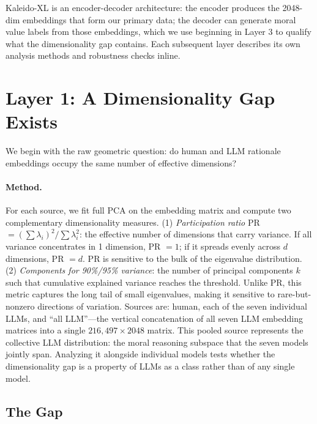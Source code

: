 \documentclass[11pt,a4paper]{article}
\begin{document}
Kaleido-XL is an encoder-decoder architecture: the encoder produces the 2048-dim embeddings that form our primary data; the decoder can generate moral value labels from those embeddings, which we use beginning in Layer 3 to qualify what the dimensionality gap contains. Each subsequent layer describes its own analysis methods and robustness checks inline.

\section{Layer 1: A Dimensionality Gap Exists}

We begin with the raw geometric question: do human and LLM rationale embeddings occupy the same number of effective dimensions?

\paragraph{Method.} For each source, we fit full PCA on the embedding matrix and compute two complementary dimensionality measures. (1) \emph{Participation ratio} PR $= (\sum \lambda_i)^2 / \sum \lambda_i^2$: the effective number of dimensions that carry variance. If all variance concentrates in 1 dimension, PR $= 1$; if it spreads evenly across $d$ dimensions, PR $= d$. PR is sensitive to the bulk of the eigenvalue distribution. (2) \emph{Components for 90\%/95\% variance}: the number of principal components $k$ such that cumulative explained variance reaches the threshold. Unlike PR, this metric captures the long tail of small eigenvalues, making it sensitive to rare-but-nonzero directions of variation. Sources are: human, each of the seven individual LLMs, and ``all LLM''---the vertical concatenation of all seven LLM embedding matrices into a single $216{,}497 \times 2048$ matrix. This pooled source represents the collective LLM distribution: the moral reasoning subspace that the seven models jointly span. Analyzing it alongside individual models tests whether the dimensionality gap is a property of LLMs as a class rather than of any single model.

\subsection{The Gap}
\end{document}
